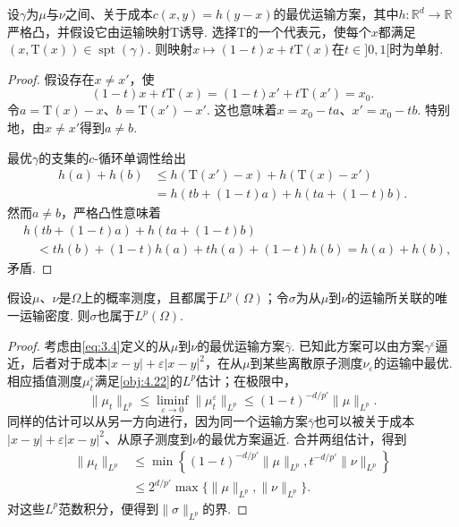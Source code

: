 \begin{lemma}\label{obj:4.23}
设$\gamma$为$\mu$与$\nu$之间、关于成本$c(x,y)=h(y-x)$的最优运输方案，其中$h:\mathbb R^d\to\mathbb R$严格凸，并假设它由运输映射$\mathrm T$诱导. 选择$\mathrm T$的一个代表元，使每个$x$都满足$(x,\mathrm T(x))\in\operatorname{spt}(\gamma)$. 则映射$x\mapsto(1-t)x+t\mathrm T(x)$在$t\in]0,1[$时为单射.
\end{lemma}
\begin{proof}
假设存在$x\ne x'$，使
\[
(1-t)x+t\mathrm T(x)=(1-t)x'+t\mathrm T(x')=x_0.
\]
令$a=\mathrm T(x)-x$、$b=\mathrm T(x')-x'$. 这也意味着$x=x_0-ta$、$x'=x_0-tb$. 特别地，由$x\ne x'$得到$a\ne b$.

最优$\gamma$的支集的$c$-循环单调性给出
\begin{equation*}\begin{aligned}
h(a)+h(b)&\leq h(\mathrm T(x')-x)+h(\mathrm T(x)-x')\\
&=h(tb+(1-t)a)+h(ta+(1-t)b).
\end{aligned}\end{equation*}
然而$a\ne b$，严格凸性意味着
\begin{equation*}\begin{aligned}
&h(tb+(1-t)a)+h(ta+(1-t)b)\\
&\quad<th(b)+(1-t)h(a)+th(a)+(1-t)h(b)
=h(a)+h(b),
\end{aligned}\end{equation*}
矛盾.
\end{proof}

\begin{theorem}\label{obj:4.24}
假设$\mu$、$\nu$是$\Omega$上的概率测度，且都属于$L^p(\Omega)$；令$\sigma$为从$\mu$到$\nu$的运输所关联的唯一运输密度. 则$\sigma$也属于$L^p(\Omega)$.
\end{theorem}
\begin{proof}
考虑由\eqref{eq:3.4}定义的从$\mu$到$\nu$的最优运输方案$\bar\gamma$. 已知此方案可以由方案$\gamma^\varepsilon$逼近，后者对于成本$|x-y|+\varepsilon|x-y|^2$，在从$\mu$到某些离散原子测度$\nu_\varepsilon$的运输中最优. 相应插值测度$\mu_t^\varepsilon$满足\autoref{obj:4.22}的$L^p$估计；在极限中，
\[
\|\mu_t\|_{L^p}\leq\liminf_{\varepsilon\to0}\|\mu_t^\varepsilon\|_{L^p}
\leq(1-t)^{-d/p'}\|\mu\|_{L^p}.
\]
同样的估计可以从另一方向进行，因为同一个运输方案$\bar\gamma$也可以被关于成本$|x-y|+\varepsilon|x-y|^2$、从原子测度到$\nu$的最优方案逼近. 合并两组估计，得到
\begin{equation*}\begin{aligned}
\|\mu_t\|_{L^p}
&\leq\min\left\{(1-t)^{-d/p'}\|\mu\|_{L^p},t^{-d/p'}\|\nu\|_{L^p}\right\}\\
&\leq2^{d/p'}\max\{\|\mu\|_{L^p},\|\nu\|_{L^p}\}.
\end{aligned}\end{equation*}
对这些$L^p$范数积分，便得到$\|\sigma\|_{L^p}$的界.
\end{proof}

